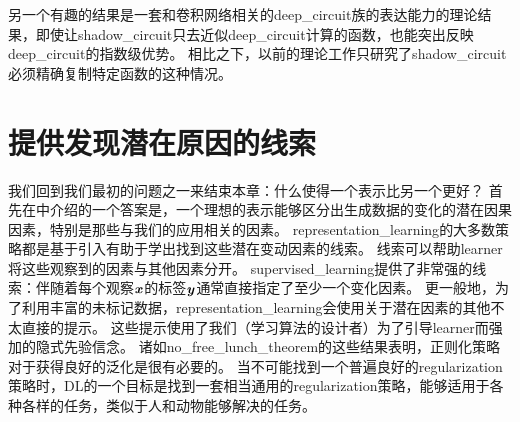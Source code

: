 另一个有趣的结果是一套和卷积网络相关的\gls{deep_circuit}族的表达能力的理论结果，即使让\gls{shadow_circuit}只去近似\gls{deep_circuit}计算的函数，也能突出反映\gls{deep_circuit}的指数级优势\citep{Cohen-et-al-arXiv2015}。
相比之下，以前的理论工作只研究了\gls{shadow_circuit}必须精确复制特定函数的这种情况。


\section{提供发现潜在原因的线索}
\label{sec:providing_clues_to_discover_underlying_causes}
我们回到我们最初的问题之一来结束本章：什么使得一个表示比另一个更好？
首先在中介绍的一个答案是，一个理想的表示能够区分出生成数据的变化的潜在因果因素，特别是那些与我们的应用相关的因素。
\gls{representation_learning}的大多数策略都是基于引入有助于学出找到这些潜在变动因素的线索。
线索可以帮助\gls{learner}将这些观察到的因素与其他因素分开。
\gls{supervised_learning}提供了非常强的线索：伴随着每个观察$\boldsymbol{\mathit{x}}$的标签$\boldsymbol{\mathit{y}}$通常直接指定了至少一个变化因素。
更一般地，为了利用丰富的未标记数据，\gls{representation_learning}会使用关于潜在因素的其他不太直接的提示。
这些提示使用了我们（学习算法的设计者）为了引导\gls{learner}而强加的隐式先验信念。
诸如\gls{no_free_lunch_theorem}的这些结果表明，正则化策略对于获得良好的泛化是很有必要的。
当不可能找到一个普遍良好的\gls{regularization}策略时，\gls{DL}的一个目标是找到一套相当通用的\gls{regularization}策略，能够适用于各种各样的任务，类似于人和动物能够解决的任务。


